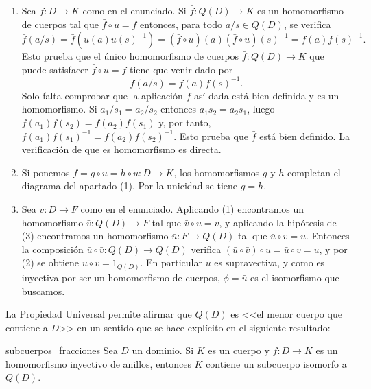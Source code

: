 \begin{proofbox}
\begin{enumerate}
\item Sea \(f: D \to K\) como en el enunciado. Si \(\bar{f}: Q(D) \to K\) es un homomorfismo de cuerpos tal que \(\bar{f} \circ u = f\) entonces, para todo \(a/s \in Q(D)\), se verifica
\[
\bar{f}(a/s) = \bar{f}(u(a)u(s)^{-1}) = (\bar{f} \circ u)(a)(\bar{f} \circ u)(s)^{-1} = f(a)f(s)^{-1}.
\]
Esto prueba que el único homomorfismo de cuerpos \(\bar{f}: Q(D) \to K\) que puede satisfacer \(\bar{f} \circ u = f\) tiene que venir dado por
\[
\bar{f}(a/s) = f(a)f(s)^{-1}.
\]
Solo falta comprobar que la aplicación \(\bar{f}\) así dada está bien definida y es un homomorfismo. Si \(a_1/s_1 = a_2/s_2\) entonces \(a_1 s_2 = a_2 s_1\), luego \(f(a_1)f(s_2) = f(a_2)f(s_1)\) y, por tanto, \(f(a_1)f(s_1)^{-1} = f(a_2)f(s_2)^{-1}\). Esto prueba que \(\bar{f}\) está bien definido. La verificación de que es homomorfismo es directa.

\item Si ponemos \(f = g \circ u = h \circ u: D \to K\), los homomorfismos \(g\) y \(h\) completan el diagrama del apartado (1). Por la unicidad se tiene \(g = h\).

\item Sea \(v: D \to F\) como en el enunciado. Aplicando (1) encontramos un homomorfismo \(\bar{v}: Q(D) \to F\) tal que \(\bar{v} \circ u = v\), y aplicando la hipótesis de (3) encontramos un homomorfismo \(\bar{u}: F \to Q(D)\) tal que \(\bar{u} \circ v = u\). Entonces la composición \(\bar{u} \circ \bar{v}: Q(D) \to Q(D)\) verifica \((\bar{u} \circ \bar{v}) \circ u = \bar{u} \circ v = u\), y por (2) se obtiene \(\bar{u} \circ \bar{v} = 1_{Q(D)}\). En particular \(\bar{u}\) es supravectiva, y como es inyectiva por ser un homomorfismo de cuerpos, \(\phi = \bar{u}\) es el isomorfismo que buscamos.
\end{enumerate}

\end{proofbox}

La Propiedad Universal permite afirmar que \(Q(D)\) es <<el menor cuerpo que contiene a \(D\)>> en un sentido que se hace explícito en el siguiente resultado:

\begin{proposition}{}{subcuerpos_fracciones}
Sea \(D\) un dominio. Si \(K\) es un cuerpo y \(f: D \to K\) es un homomorfismo inyectivo de anillos, entonces \(K\) contiene un subcuerpo isomorfo a \(Q(D)\).
\end{proposition}

